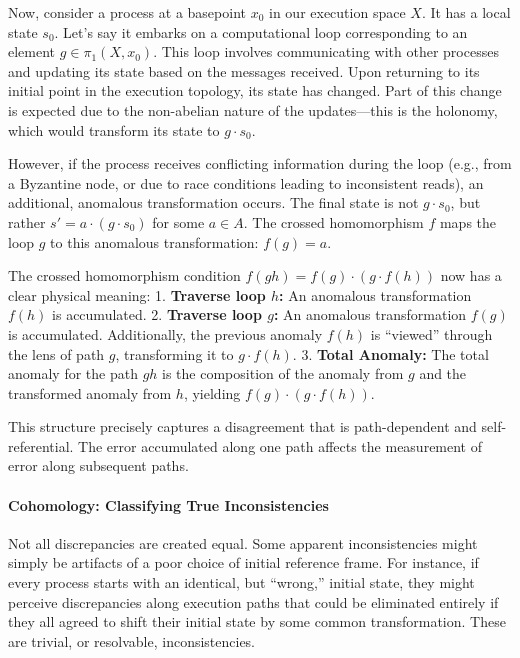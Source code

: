 \documentclass[
]{article}
\begin{document}
Now, consider a process at a basepoint \(x_0\) in our execution space
\(X\). It has a local state \(s_0\). Let's say it embarks on a
computational loop corresponding to an element \(g \in \pi_1(X, x_0)\).
This loop involves communicating with other processes and updating its
state based on the messages received. Upon returning to its initial
point in the execution topology, its state has changed. Part of this
change is expected due to the non-abelian nature of the updates---this
is the holonomy, which would transform its state to \(g \cdot s_0\).

However, if the process receives conflicting information during the loop
(e.g., from a Byzantine node, or due to race conditions leading to
inconsistent reads), an additional, anomalous transformation occurs. The
final state is not \(g \cdot s_0\), but rather
\(s' = a \cdot (g \cdot s_0)\) for some \(a \in A\). The crossed
homomorphism \(f\) maps the loop \(g\) to this anomalous transformation:
\(f(g) = a\).

The crossed homomorphism condition \(f(gh) = f(g) \cdot (g \cdot f(h))\)
now has a clear physical meaning: 1. \textbf{Traverse loop \(h\):} An
anomalous transformation \(f(h)\) is accumulated. 2. \textbf{Traverse
loop \(g\):} An anomalous transformation \(f(g)\) is accumulated.
Additionally, the previous anomaly \(f(h)\) is ``viewed'' through the
lens of path \(g\), transforming it to \(g \cdot f(h)\). 3.
\textbf{Total Anomaly:} The total anomaly for the path \(gh\) is the
composition of the anomaly from \(g\) and the transformed anomaly from
\(h\), yielding \(f(g) \cdot (g \cdot f(h))\).

This structure precisely captures a disagreement that is path-dependent
and self-referential. The error accumulated along one path affects the
measurement of error along subsequent paths.

\paragraph{Cohomology: Classifying True
Inconsistencies}\label{cohomology-classifying-true-inconsistencies}

Not all discrepancies are created equal. Some apparent inconsistencies
might simply be artifacts of a poor choice of initial reference frame.
For instance, if every process starts with an identical, but ``wrong,''
initial state, they might perceive discrepancies along execution paths
that could be eliminated entirely if they all agreed to shift their
initial state by some common transformation. These are trivial, or
resolvable, inconsistencies.
\end{document}
